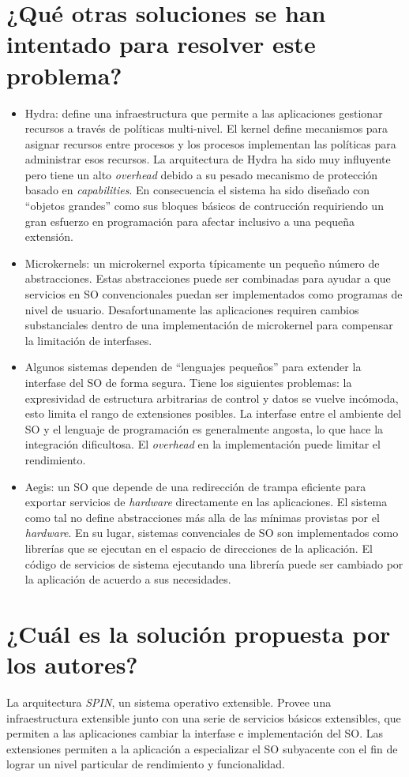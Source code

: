 \section{¿Qué otras soluciones se han intentado para resolver este problema?}
\begin{itemize}
    \item Hydra: define una infraestructura que permite a las aplicaciones gestionar recursos a través de políticas multi-nivel. El kernel define mecanismos para asignar recursos entre procesos y los procesos implementan las políticas para administrar esos recursos. La arquitectura de Hydra ha sido muy influyente pero tiene un alto \textit{overhead} debido a su pesado mecanismo de protección basado en \textit{capabilities}. En consecuencia el sistema ha sido diseñado con ``objetos grandes'' como sus bloques básicos de contrucción requiriendo un gran esfuerzo en programación para afectar inclusivo a una pequeña extensión.
    \item Microkernels: un microkernel exporta típicamente un pequeño número de abstracciones. Estas abstracciones puede ser combinadas para ayudar a que servicios en SO convencionales puedan ser implementados como programas de nivel de usuario. Desafortunamente las aplicaciones requiren cambios substanciales dentro de una implementación de microkernel para compensar la limitación de interfases.
    \item Algunos sistemas dependen de ``lenguajes pequeños'' para extender la interfase del SO de forma segura. Tiene los siguientes problemas: la expresividad de estructura arbitrarias de control y datos se vuelve incómoda, esto limita el rango de extensiones posibles. La interfase entre el ambiente del SO y el lenguaje de programación es generalmente angosta, lo que hace la integración dificultosa. El \textit{overhead} en la implementación puede limitar el rendimiento. 
    \item Aegis: un SO que depende de una redirección de trampa eficiente para exportar servicios de \textit{hardware} directamente en las aplicaciones. El sistema como tal no define abstracciones más alla de las mínimas provistas por el \textit{hardware}. En su lugar, sistemas convenciales de SO son implementados como librerías que se ejecutan en el espacio de direcciones de la aplicación. El código de servicios de sistema ejecutando una librería puede ser cambiado por la aplicación de acuerdo a sus necesidades.
\end{itemize}
     
\section{¿Cuál es la solución propuesta por los autores?}
La arquitectura \textit{SPIN}, un sistema operativo extensible. Provee una infraestructura extensible junto con una serie de servicios básicos extensibles, que permiten a las aplicaciones cambiar la interfase e implementación del SO. Las extensiones permiten a la aplicación a especializar el SO subyacente con el fin de lograr un nivel particular de rendimiento y funcionalidad.

